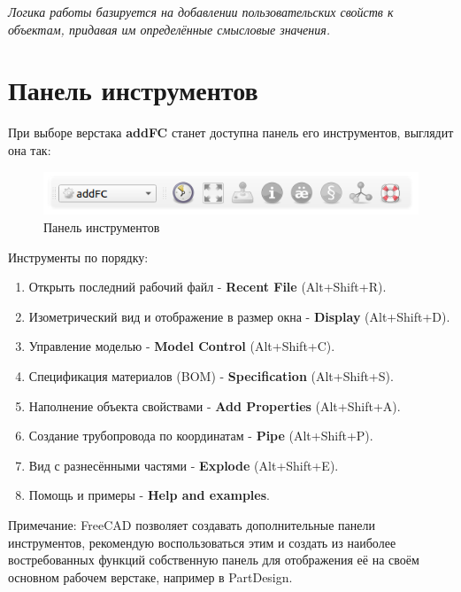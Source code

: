 \documentclass[a4paper,12pt]{article}
\begin{document}
\begin{center}\emph{Логика работы базируется на добавлении пользовательских свойств к объектам, придавая им определённые смысловые значения.}\end{center}



\section{Панель инструментов}
При выборе верстака \textbf{addFC} станет доступна панель его инструментов, выглядит она так:

\begin{figure}[htp]
\centering
\includegraphics[scale=0.8]{img/toolbar.png}
\caption{Панель инструментов}
\label{sec:toolbar}
\end{figure}

\begin{flushleft}Инструменты по порядку:\end{flushleft}
\begin{enumerate}
	\item Открыть последний рабочий файл - \textbf{Recent File} (Alt+Shift+R).\label{sec:1}
	\item Изометрический вид и отображение в размер окна - \textbf{Display} (Alt+Shift+D).\label{sec:2}
	\item Управление моделью - \textbf{Model Control} (Alt+Shift+C).\label{sec:3}
	\item Спецификация материалов (BOM) - \textbf{Specification} (Alt+Shift+S).\label{sec:4}
	\item Наполнение объекта свойствами - \textbf{Add Properties} (Alt+Shift+A).\label{sec:5}
	\item Создание трубопровода по координатам - \textbf{Pipe} (Alt+Shift+P).\label{sec:6}
	\item Вид с разнесёнными частями - \textbf{Explode} (Alt+Shift+E).\label{sec:7}
	\item Помощь и примеры - \textbf{Help and examples}.\label{sec:8}
\end{enumerate}

Примечание: FreeCAD позволяет создавать дополнительные панели инструментов, рекомендую воспользоваться этим и создать из наиболее востребованных функций собственную панель для отображения её на своём основном рабочем верстаке, например в PartDesign.
\end{document}
